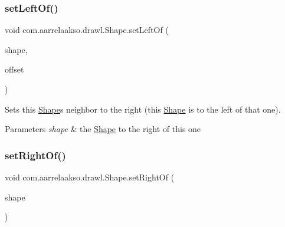 \subsubsection{\texorpdfstring{set\+Left\+Of()}{setLeftOf()}\hspace{0.1cm}{\footnotesize\ttfamily [2/2]}}
{\footnotesize\ttfamily void com.\+aarrelaakso.\+drawl.\+Shape.\+set\+Left\+Of (\begin{DoxyParamCaption}\item[{@Not\+Null \hyperlink{classcom_1_1aarrelaakso_1_1drawl_1_1_shape}{Shape}}]{shape,  }\item[{@Not\+Null \hyperlink{classcom_1_1aarrelaakso_1_1drawl_1_1_measure}{Measure}}]{offset }\end{DoxyParamCaption})\hspace{0.3cm}{\ttfamily [inherited]}}



Sets this \hyperlink{classcom_1_1aarrelaakso_1_1drawl_1_1_shape}{Shape}\textquotesingle{}s neighbor to the right (this \hyperlink{classcom_1_1aarrelaakso_1_1drawl_1_1_shape}{Shape} is to the left of that one). 


\begin{DoxyParams}{Parameters}
{\em shape} & the \hyperlink{classcom_1_1aarrelaakso_1_1drawl_1_1_shape}{Shape} to the right of this one \\
\hline
\end{DoxyParams}
\mbox{\label{classcom_1_1aarrelaakso_1_1drawl_1_1_shape_ae658426065f0d35bd721cd94bc540209}} 
\subsubsection{\texorpdfstring{set\+Right\+Of()}{setRightOf()}\hspace{0.1cm}{\footnotesize\ttfamily [1/2]}}
{\footnotesize\ttfamily void com.\+aarrelaakso.\+drawl.\+Shape.\+set\+Right\+Of (\begin{DoxyParamCaption}\item[{@Not\+Null \hyperlink{classcom_1_1aarrelaakso_1_1drawl_1_1_shape}{Shape}}]{shape }\end{DoxyParamCaption})\hspace{0.3cm}{\ttfamily [inherited]}}



